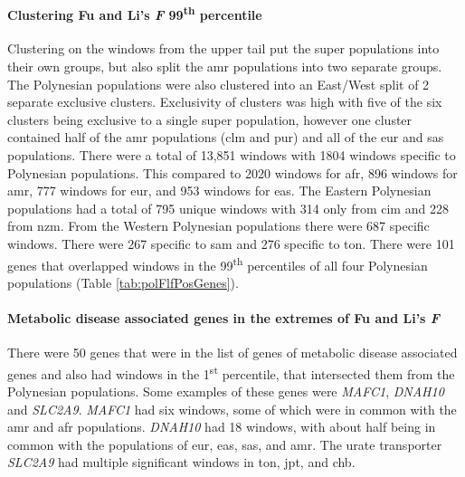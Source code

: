 \documentclass[]{report}
\let\oldparagraph\paragraph
\renewcommand{\paragraph}[1]{\oldparagraph{#1}\mbox{}}
\begin{document}
\paragraph{\texorpdfstring{Clustering Fu and Li's \emph{F}
99\textsuperscript{th}
percentile}{Clustering Fu and Li's F 99th percentile}}\label{clustering-fu-and-lis-f-99th-percentile}

Clustering on the windows from the upper tail put the super populations
into their own groups, but also split the \gls{amr} populations into two
separate groups. The Polynesian populations were also clustered into an
East/West split of 2 separate exclusive clusters. Exclusivity of
clusters was high with five of the six clusters being exclusive to a
single super population, however one cluster contained half of the
\gls{amr} populations (\gls{clm} and \gls{pur}) and all of the \gls{eur}
and \gls{sas} populations. There were a total of 13,851 windows with
1804 windows specific to Polynesian populations. This compared to 2020
windows for \gls{afr}, 896 windows for \gls{amr}, 777 windows for
\gls{eur}, and 953 windows for \gls{eas}. The Eastern Polynesian
populations had a total of 795 unique windows with 314 only from
\gls{cim} and 228 from \gls{nzm}. From the Western Polynesian
populations there were 687 specific windows. There were 267 specific to
\gls{sam} and 276 specific to \gls{ton}. There were 101 genes that
overlapped windows in the 99\textsuperscript{th} percentiles of all four
Polynesian populations (Table \ref{tab:polFlfPosGenes}).

\paragraph{\texorpdfstring{Metabolic disease associated genes in the
extremes of Fu and Li's
\emph{F}}{Metabolic disease associated genes in the extremes of Fu and Li's F}}\label{metabolic-disease-associated-genes-in-the-extremes-of-fu-and-lis-f}

There were 50 genes that were in the list of genes of metabolic disease
associated genes and also had windows in the 1\textsuperscript{st}
percentile, that intersected them from the Polynesian populations. Some
examples of these genes were \emph{MAFC1}, \emph{DNAH10} and
\emph{SLC2A9}. \emph{MAFC1} had six windows, some of which were in
common with the \gls{amr} and \gls{afr} populations. \emph{DNAH10} had
18 windows, with about half being in common with the populations of
\gls{eur}, \gls{eas}, \gls{sas}, and \gls{amr}. The urate transporter
\emph{SLC2A9} had multiple significant windows in \gls{ton}, \gls{jpt},
and \gls{chb}.
\end{document}

